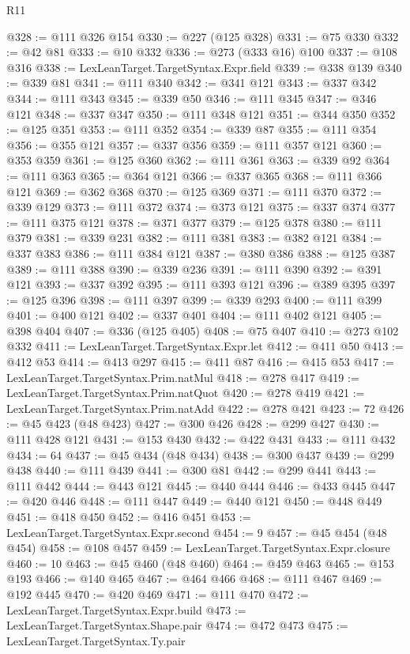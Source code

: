 \begin{lexlean}{R11}
\begin{coremodule}
{{{{{{{{{{{{{{{{{{{{{{{{{{{{{{{{{{{{{{{{{{{{{{{{{{{{{{{{{{{{{{{{{{{{{{{{{{{{{{{{{{@328 := @111 @326 @154
@330 := @227 (@125 @328)
@331 := @75 @330
@332 := @42 @81
@333 := @10 @332
@336 := @273 (@333 @16) @100
@337 := @108 @316
@338 := LexLeanTarget.TargetSyntax.Expr.field
@339 := @338 @139
@340 := @339 @81
@341 := @111 @340
@342 := @341 @121
@343 := @337 @342
@344 := @111 @343
@345 := @339 @50
@346 := @111 @345
@347 := @346 @121
@348 := @337 @347
@350 := @111 @348 @121
@351 := @344 @350
@352 := @125 @351
@353 := @111 @352
@354 := @339 @87
@355 := @111 @354
@356 := @355 @121
@357 := @337 @356
@359 := @111 @357 @121
@360 := @353 @359
@361 := @125 @360
@362 := @111 @361
@363 := @339 @92
@364 := @111 @363
@365 := @364 @121
@366 := @337 @365
@368 := @111 @366 @121
@369 := @362 @368
@370 := @125 @369
@371 := @111 @370
@372 := @339 @129
@373 := @111 @372
@374 := @373 @121
@375 := @337 @374
@377 := @111 @375 @121
@378 := @371 @377
@379 := @125 @378
@380 := @111 @379
@381 := @339 @231
@382 := @111 @381
@383 := @382 @121
@384 := @337 @383
@386 := @111 @384 @121
@387 := @380 @386
@388 := @125 @387
@389 := @111 @388
@390 := @339 @236
@391 := @111 @390
@392 := @391 @121
@393 := @337 @392
@395 := @111 @393 @121
@396 := @389 @395
@397 := @125 @396
@398 := @111 @397
@399 := @339 @293
@400 := @111 @399
@401 := @400 @121
@402 := @337 @401
@404 := @111 @402 @121
@405 := @398 @404
@407 := @336 (@125 @405)
@408 := @75 @407
@410 := @273 @102 @332
@411 := LexLeanTarget.TargetSyntax.Expr.let
@412 := @411 @50
@413 := @412 @53
@414 := @413 @297
@415 := @411 @87
@416 := @415 @53
@417 := LexLeanTarget.TargetSyntax.Prim.natMul
@418 := @278 @417
@419 := LexLeanTarget.TargetSyntax.Prim.natQuot
@420 := @278 @419
@421 := LexLeanTarget.TargetSyntax.Prim.natAdd
@422 := @278 @421
@423 := 72
@426 := @45 @423 (@48 @423)
@427 := @300 @426
@428 := @299 @427
@430 := @111 @428 @121
@431 := @153 @430
@432 := @422 @431
@433 := @111 @432
@434 := 64
@437 := @45 @434 (@48 @434)
@438 := @300 @437
@439 := @299 @438
@440 := @111 @439
@441 := @300 @81
@442 := @299 @441
@443 := @111 @442
@444 := @443 @121
@445 := @440 @444
@446 := @433 @445
@447 := @420 @446
@448 := @111 @447
@449 := @440 @121
@450 := @448 @449
@451 := @418 @450
@452 := @416 @451
@453 := LexLeanTarget.TargetSyntax.Expr.second
@454 := 9
@457 := @45 @454 (@48 @454)
@458 := @108 @457
@459 := LexLeanTarget.TargetSyntax.Expr.closure
@460 := 10
@463 := @45 @460 (@48 @460)
@464 := @459 @463
@465 := @153 @193
@466 := @140 @465
@467 := @464 @466
@468 := @111 @467
@469 := @192 @445
@470 := @420 @469
@471 := @111 @470
@472 := LexLeanTarget.TargetSyntax.Expr.build
@473 := LexLeanTarget.TargetSyntax.Shape.pair
@474 := @472 @473
@475 := LexLeanTarget.TargetSyntax.Ty.pair
}}}}}}}}}}}}}}}}}}}}}}}}}}}}}}}}}}}}}}}}}}}}}}}}}}}}}}}}}}}}}}}}}}}}}}}}}}}}}}}}}}
\end{coremodule}
\end{lexlean}
